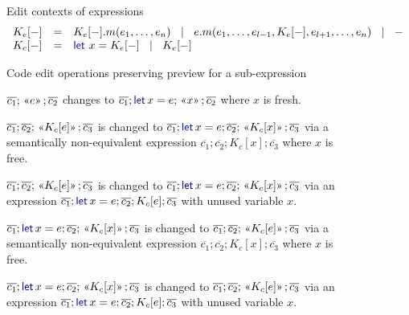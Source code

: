 \documentclass[english,submission]{programming}
\theoremstyle{plain}
\theoremstyle{definition}
\newcommand{\lsep}{\;\;|\;\;}
\newcommand{\kvd}[1]{\textnormal{\textcolor{kvdclr}{\sffamily #1}}}
\newcommand{\rname}[1]{{\sffamily(#1)}}
\newcommand{\ername}[1]{\vspace{0.75em}\rname{#1}\hspace{0.5em}}
\newcommand{\preview}[1]{\,\textnormal{\guillemotleft} #1\textnormal{\guillemotright}\,}
\begin{document}
\begin{figure}[t]
\raggedright
\vspace{-0.5em}
{\small\sffamily Edit contexts of expressions}
\begin{equation*}
\begin{array}{lcl}
K_e[-] &=& K_e[-].m(e_1, \ldots, e_n) ~\lsep~ e.m(e_1, \ldots, e_{l-1}, K_e[-], e_{l+1},\ldots , e_n) ~\lsep~ -\\
K_c[-] &=& \kvd{let}~x = K_e[-] ~\lsep~ K_e[-]\\
\end{array}
\end{equation*}

\vspace{0.5em}
{\small\sffamily Code edit operations preserving preview for a sub-expression}

\hspace{2.5em}\begin{minipage}[c]{0.868\textwidth}
  \raggedright\setlength{\parindent}{-1em}

  \ername{let-intro-var}
  $\overline{c_1}; \preview{e}; \overline{c_2}$ changes to
  $\overline{c_1}; \kvd{let}\,x = e; \preview{x}; \overline{c_2}$ where $x$ is fresh.

  \ername{let-intro-ins}
  $\overline{c_1}; \overline{c_2}; \preview{K_c[e]}; \overline{c_3}$ is changed to
  $\overline{c_1}; \kvd{let}\,x=e; \overline{c_2}; \preview{K_c[x]}; \overline{c_3}$ via
  a semantically non-equivalent expression
  $\overline{c_1}; \overline{c_2}; K_c[x]; \overline{c_3}$ where $x$ is free.

  \ername{let-intro-del}
  $\overline{c_1}; \overline{c_2}; \preview{K_c[e]}; \overline{c_3}$ is changed to
  $\overline{c_1}; \kvd{let}\,x=e; \overline{c_2}; \preview{K_c[x]}; \overline{c_3}$ via
  an expression $\overline{c_1}; \kvd{let}\,x=e; \overline{c_2}; K_c[e]; \overline{c_3}$
  with unused variable $x$.

  \ername{let-elim-del}
  $\overline{c_1}; \kvd{let}\,x=e; \overline{c_2}; \preview{K_c[x]}; \overline{c_3}$ is changed to
  $\overline{c_1}; \overline{c_2}; \preview{K_c[e]}; \overline{c_3}$ via
  a semantically non-equivalent expression
  $\overline{c_1}; \overline{c_2}; K_c[x]; \overline{c_3}$ where $x$ is free.

  \ername{let-elim-ins}
  $\overline{c_1}; \kvd{let}\,x=e; \overline{c_2}; \preview{K_c[x]}; \overline{c_3}$ is changed to
  $\overline{c_1}; \overline{c_2}; \preview{K_c[e]}; \overline{c_3}$ via
  an expression $\overline{c_1}; \kvd{let}\,x=e; \overline{c_2}; K_c[e]; \overline{c_3}$
  with unused variable $x$.


\end{minipage}
\end{figure}
\end{document}
